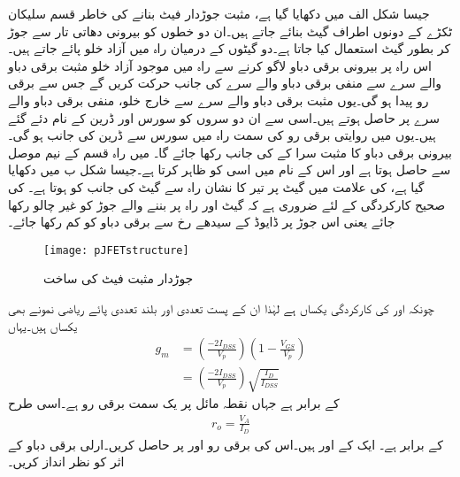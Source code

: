 جیسا شکل  الف میں دکھایا گیا ہے، مثبت جوڑدار فیٹ بنانے کی خاطر  قسم سلیکان ٹکڑے کے دونوں اطراف  گیٹ بنائے جاتے ہیں۔ان دو خطوں کو بیرونی دھاتی تار سے جوڑ کر بطور  گیٹ  استعمال کیا جاتا ہے۔دو گیٹوں کے درمیان راہ میں آزاد خلو پائے جاتے ہیں۔اس راہ پر بیرونی برقی دباو  لاگو کرنے سے راہ میں موجود آزاد خلو مثبت برقی دباو والے سرے سے منفی برقی دباو والے سرے کی جانب حرکت کریں گے جس سے برقی رو  پیدا ہو گی۔یوں مثبت برقی دباو والے سرے سے خارج خلو، منفی برقی دباو والے سرے پر حاصل ہوتے ہیں۔اسی سے ان دو سروں کو سورس  اور ڈرین  کے نام دئے گئے ہیں۔یوں  میں روایتی برقی رو کی سمت راہ میں سورس سے ڈرین کی جانب ہو گی۔بیرونی برقی دباو کا مثبت سرا  کے  کی جانب رکھا جائے گا۔ میں راہ  قسم کے نیم موصل سے حاصل ہوتا ہے اور اس کے نام میں  اسی  کو ظاہر کرتا ہے۔جیسا شکل  ب میں دکھایا گیا ہے،  کی علامت میں گیٹ پر تیر کا نشان راہ سے گیٹ کی جانب کو ہوتا ہے۔ کی صحیح کارکردگی کے لئے ضروری ہے کہ گیٹ اور راہ پر بننے والے  جوڑ کو غیر چالو رکھا جائے یعنی اس جوڑ پر ڈایوڈ کے سیدھے رخ  سے برقی دباو کو کم رکھا جائے۔
\begin{figure}
\centering
\texttt{[image: pJFETstructure]}
\caption{جوڑدار مثبت فیٹ کی ساخت}
\label{شکل_جوڑدار_مثبت_فیٹ_ساخت}
\end{figure}
چونکہ  اور  کی کارکردگی یکساں ہے لہٰذا ان کے پست تعددی اور بلند تعددی پائے ریاضی نمونے بھی یکساں ہیں۔یہاں
\begin{align} \label{مساوات_افزائش_فیٹ}
g_m &=\left(\frac{-2  I_{DSS}}{V_p} \right) \left(1-\frac{V_{GS}}{V_p} \right) \\
&=\left(\frac{-2  I_{DSS}}{V_p} \right)  \sqrt{\frac{I_D}{I_{DSS}}}
\end{align} 
کے برابر ہے جہاں  نقطہ مائل پر یک سمت برقی رو ہے۔اسی طرح
\begin{align}
r_o=\frac{V_A}{I_D}
\end{align} 
کے برابر ہے۔
ایک  کے  اور  ہیں۔اس کی برقی رو  اور  پر حاصل کریں۔ارلی برقی دباو کے اثر کو نظر انداز کریں۔

